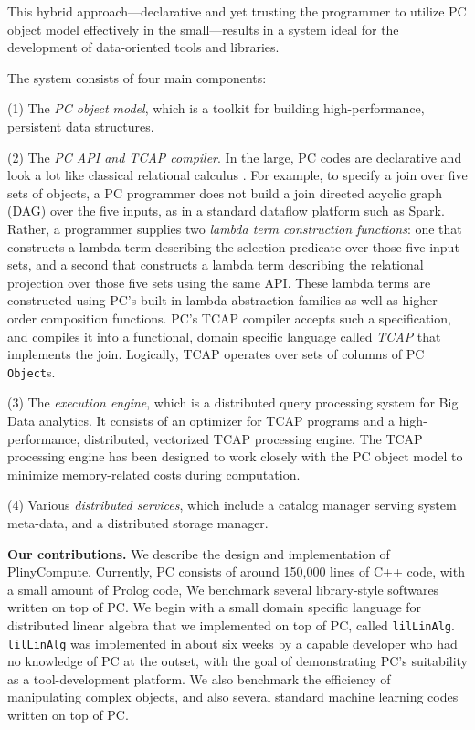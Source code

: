 This hybrid approach---declarative and yet trusting the programmer
to utilize PC object model effectively
in the small---results in a system ideal for the 
development of data-oriented tools and libraries.

The system consists of four main components: 

\vspace{3pt}
\noindent
(1) The \emph{PC object model}, which is a toolkit for building high-performance, persistent data structures.

\vspace {3pt}
\noindent
(2) The \emph{PC API and TCAP compiler}.  In the large, PC codes are
declarative and look a lot like classical relational calculus
\cite{codd1971data}.  For example, to specify a join over five sets of
objects, a PC programmer does not build a join directed acyclic graph (DAG) over the five inputs, as in a standard
dataflow platform such as Spark.  Rather, a programmer 
supplies two \emph{lambda term construction functions}: one that constructs a lambda term describing the selection
predicate over those five input sets, 
and a second that constructs a lambda term describing the relational projection over those five sets
using the same API.  These lambda terms are constructed using PC's built-in lambda abstraction families as well as higher-order composition functions.
 PC's TCAP compiler 
accepts such a specification, and compiles it into a functional, domain specific language called \emph{TCAP} that implements
the join.  Logically, TCAP operates over
sets of columns of PC \texttt{Object}s. 

\vspace{3pt}
\noindent
(3) The \emph{execution engine}, which is a distributed query processing
  system for Big Data analytics.
  It consists of an optimizer for TCAP
  programs and a 
high-performance, distributed, vectorized TCAP processing engine. 
The TCAP processing engine has been designed to work closely with the PC object model to
minimize memory-related costs during computation.

\vspace{3pt}
\noindent
(4) Various \emph{distributed services}, which include 
a catalog manager serving system meta-data, and a
distributed storage manager.



\vspace{8 pt}
\noindent
\textbf{Our contributions.}
We describe the design and implementation of PlinyCompute.  
Currently, PC consists of around
150,000 lines of C++ code, with a small amount of Prolog code,
We benchmark several library-style softwares written on top of PC.  We begin with a small domain specific language
for distributed linear algebra that we implemented on top of PC,
called \texttt{lilLinAlg}.  \texttt{lilLinAlg} was implemented in
about six weeks by a capable developer
who had no knowledge of PC at the outset, with the goal of demonstrating PC's suitability as a tool-development platform.  
We also benchmark the efficiency of manipulating complex objects, and also several standard machine learning codes written on top of PC.
